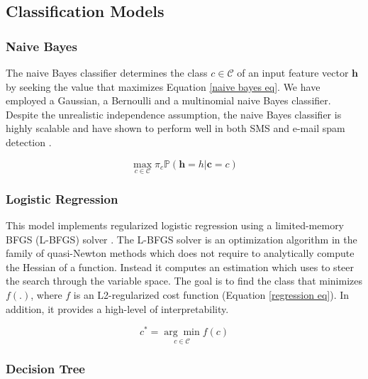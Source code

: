 \documentclass[letterpaper]{article}
\begin{document}
\subsection{Classification Models}  \label{Classification}

\subsubsection{Naive Bayes}  \label{Naive Bayes}

The naive Bayes classifier determines the class $c \in \mathcal{C}$ of an input feature vector $\mathbf{h}$ by seeking the value that maximizes Equation \ref{naive bayes eq}. We have employed a Gaussian, a Bernoulli and a multinomial naive Bayes classifier. Despite the unrealistic independence assumption, the naive Bayes classifier is highly scalable and have shown to perform well in both SMS and e-mail spam detection \cite{gomez2006content} \cite{androutsopoulos2000evaluation}.

\begin{equation} \label{naive bayes eq}
	\underset{c \in \mathcal{C}}{\max} \pi_c \mathds{P} (\mathbf{h} = h | \mathbf{c} = c)
\end{equation}

\subsubsection{Logistic Regression}  \label{Logistic Regression}

This model implements regularized logistic regression using a limited-memory BFGS (L-BFGS) solver \cite{liu1989limited}. The L-BFGS solver is an optimization algorithm in the family of quasi-Newton methods which does not require to analytically compute the Hessian of a function. Instead it computes an estimation which uses to steer the search through the variable space. The goal is to find the class that minimizes $f(.)$, where $f$ is an L2-regularized cost function (Equation \ref{regression eq}). In addition, it provides a high-level of interpretability.

\begin{equation} \label{regression eq}
	c^* = \underset{c \in \mathcal{C}}{\arg \min} f(c) 
\end{equation}

\subsubsection{Decision Tree} \label{Decision Tree}
\end{document}
